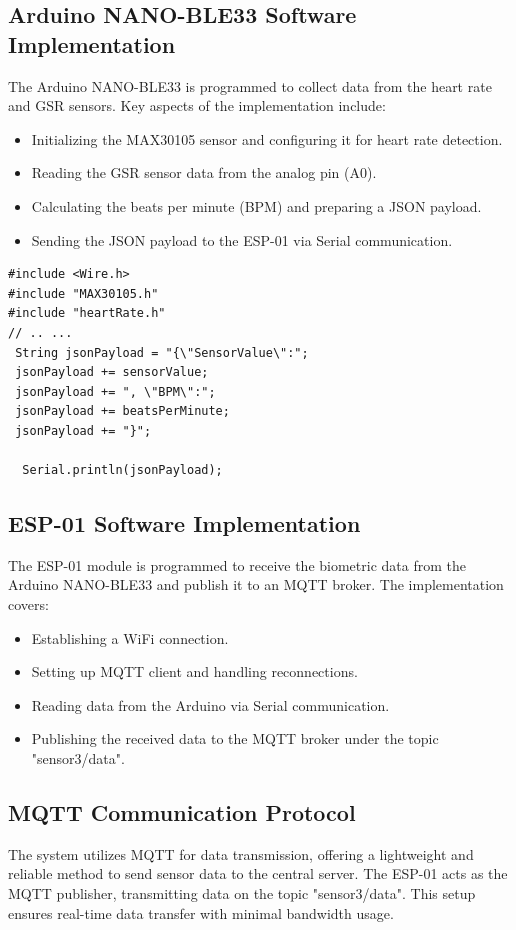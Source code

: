 \documentclass{article}
\begin{document}
\subsection{Arduino NANO-BLE33 Software Implementation}
The Arduino NANO-BLE33 is programmed to collect data from the heart rate and GSR sensors. Key aspects of the implementation include:
\begin{itemize}
    \item Initializing the MAX30105 sensor and configuring it for heart rate detection.
    \item Reading the GSR sensor data from the analog pin (A0).
    \item Calculating the beats per minute (BPM) and preparing a JSON payload.
    \item Sending the JSON payload to the ESP-01 via Serial communication.
\end{itemize}
\begin{verbatim}
#include <Wire.h>
#include "MAX30105.h"
#include "heartRate.h"
// .. ...
 String jsonPayload = "{\"SensorValue\":";
 jsonPayload += sensorValue;
 jsonPayload += ", \"BPM\":";
 jsonPayload += beatsPerMinute;
 jsonPayload += "}";

  Serial.println(jsonPayload);
\end{verbatim}

\subsection{ESP-01 Software Implementation}
The ESP-01 module is programmed to receive the biometric data from the Arduino NANO-BLE33 and publish it to an MQTT broker. The implementation covers:
\begin{itemize}
    \item Establishing a WiFi connection.
    \item Setting up MQTT client and handling reconnections.
    \item Reading data from the Arduino via Serial communication.
    \item Publishing the received data to the MQTT broker under the topic "sensor3/data".
\end{itemize}


\subsection{MQTT Communication Protocol}
The system utilizes MQTT for data transmission, offering a lightweight and reliable method to send sensor data to the central server. The ESP-01 acts as the MQTT publisher, transmitting data on the topic "sensor3/data". This setup ensures real-time data transfer with minimal bandwidth usage.
\end{document}
